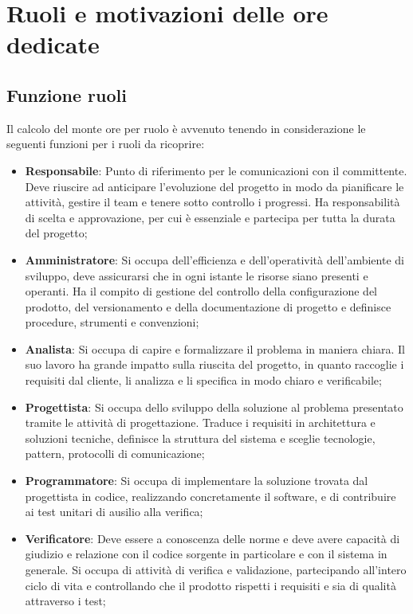 \documentclass[a4paper,12pt]{article}
\begin{document}
\section{Ruoli e motivazioni delle ore dedicate}{
    \subsection{Funzione ruoli}{
        Il calcolo del monte ore per ruolo è avvenuto tenendo in considerazione le seguenti funzioni per i ruoli da ricoprire:
        
        \begin{itemize}
            \item \textbf{Responsabile}: Punto di riferimento per le comunicazioni con il committente. Deve riuscire ad anticipare l'evoluzione del progetto in modo da pianificare le attività, gestire il team e tenere sotto controllo i progressi. Ha responsabilità di scelta e approvazione, per cui è essenziale e partecipa per tutta la durata del progetto;
            \item \textbf{Amministratore}: Si occupa dell'efficienza e dell'operatività dell'ambiente di sviluppo, deve assicurarsi che in ogni istante le risorse siano presenti e operanti. Ha il compito di gestione del controllo della configurazione del prodotto, del versionamento e della documentazione di progetto e definisce procedure, strumenti e convenzioni;
            \item \textbf{Analista}: Si occupa di capire e formalizzare il problema in maniera chiara. Il suo lavoro ha grande impatto sulla riuscita del progetto, in quanto raccoglie i requisiti dal cliente, li analizza e li specifica in modo chiaro e verificabile;
            \item \textbf{Progettista}: Si occupa dello sviluppo della soluzione al problema presentato tramite le attività di progettazione. Traduce i requisiti in architettura e soluzioni tecniche, definisce la struttura del sistema e sceglie tecnologie, pattern, protocolli di comunicazione;
            \item \textbf{Programmatore}: Si occupa di implementare la soluzione trovata dal progettista in codice, realizzando concretamente il software, e di contribuire ai test unitari di ausilio alla verifica;
            \item \textbf{Verificatore}: Deve essere a conoscenza delle norme e deve avere capacità di giudizio e relazione con il codice sorgente in particolare e con il sistema in generale. Si occupa di attività di verifica e validazione, partecipando all'intero ciclo di vita e controllando che il prodotto rispetti i requisiti e sia di qualità attraverso i test;
        \end{itemize}
    }
    
}
\end{document}
